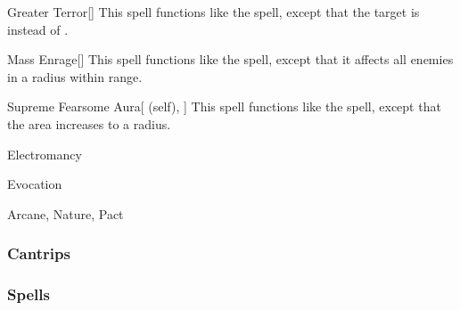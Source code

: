 \lowercase{\hypertarget{spell:Greater Terror}{}}\label{spell:Greater Terror}
\begin{freeability}[\nth{5}]{\hypertarget{spell:Greater Terror}{Greater Terror}}[]
This spell functions like the  spell, except that the target is  instead of .
\end{freeability}
\vspace{0.25em}



\lowercase{\hypertarget{spell:Mass Enrage}{}}\label{spell:Mass Enrage}
\begin{freeability}[\nth{5}]{\hypertarget{spell:Mass Enrage}{Mass Enrage}}[]
This spell functions like the  spell, except that it affects all enemies in a \areamed radius within \rngmed range.
\end{freeability}
\vspace{0.25em}



\lowercase{\hypertarget{spell:Supreme Fearsome Aura}{}}\label{spell:Supreme Fearsome Aura}
\begin{attuneability}[\nth{6}]{\hypertarget{spell:Supreme Fearsome Aura}{Supreme Fearsome Aura}}[ (self), ]
This spell functions like the  spell, except that the area increases to a \arealarge radius.
\end{attuneability}
\vspace{0.25em}


\newpage
\begin{spellsection}{Electromancy}

\begin{spellheader}
\end{spellheader}


 Evocation

 Arcane, Nature, Pact

\subsubsection{Cantrips}


\end{spellsection}


\subsubsection{Spells}


